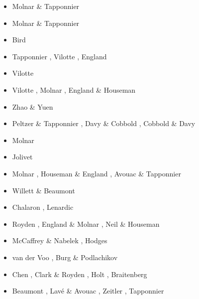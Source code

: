 \begin{itemize}
\begin{scriptsize}
\begin{itemize}
\item[\nineteenseventyfive] Molnar \& Tapponnier \cite{mota75}
\item[\nineteenseventyseven]  Molnar \& Tapponnier \cite{mota77}
\item[\nineteenseventyeight] Bird \cite{bird78}
\item[\nineteeneightytwo] Tapponnier \etal \cite{tapl82}, Vilotte \etal \cite{vidm82}, 
                          England \cite{engl82}
\item[\nineteeneightyfour] Vilotte \etal \cite{vidm84}
\item[\nineteeneightysix] Vilotte \etal \cite{vimd86}, Molnar \cite{moln86}, 
                          England \& Houseman \cite{enho86}
\item[\nineteeneightyseven] Zhao \& Yuen \cite{zhyu87b} 
\item[\nineteeneightyeight] Peltzer \& Tapponnier \cite{peta88}, Davy \& Cobbold \cite{daco88}, 
                            Cobbold \& Davy \cite{coda88}
\item[\nineteeneightynine] Molnar \cite{moln89}
\item[\nineteenninety] Jolivet \etal \cite{jodc90}
\item[\nineteenninetythree] Molnar \etal \cite{moem93}, Houseman \& England \cite{hoen93}, 
                            Avouac \& Tapponnier \cite{avta93}
\item[\nineteenninetyfour] Willett \& Beaumont \cite{wibe94}
\item[\nineteenninetyfive] Chalaron \etal \cite{chmm95}, Lenardic \etal \cite{leka95}
\item[\nineteenninetyseven] Royden \etal \cite{robk97}, England \& Molnar \cite{enmo97}, 
                            Neil \& Houseman \cite{neho97}
\item[\nineteenninetyeight] McCaffrey \& Nabelek \cite{mcna98}, Hodges \cite{hodg98}
\item[\nineteenninetynine] van der Voo \etal \cite{vasb99}, Burg \& Podlachikov \cite{bupo99}
\item[\twothousand] Chen \etal \cite{chbl00}, Clark \& Royden \cite{clro00}, 
                    Holt \cite{holt00}, Braitenberg \etal \cite{brzf00}
\item[\twothousandone] Beaumont \etal \cite{bejn01}, Lav{\'e} \& Avouac \cite{laav01}, 
                       Zeitler \etal \cite{zemk01}, Tapponnier \etal \cite{tazr01}

\end{itemize}
\end{scriptsize}
\end{itemize}
